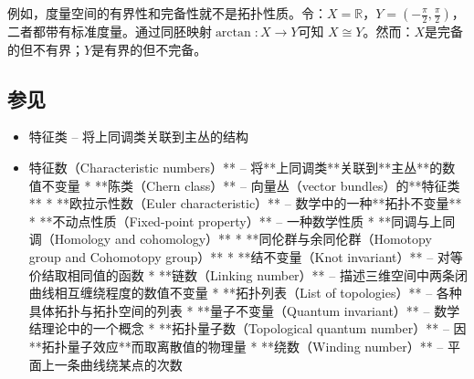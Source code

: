 例如，度量空间的有界性和完备性就不是拓扑性质。令：$X = \mathbb{R}$，$Y = \left(-\tfrac{\pi}{2}, \tfrac{\pi}{2}\right)$，二者都带有标准度量。通过同胚映射$
\arctan: X \to Y$可知 $X \cong Y$。然而：$X$是完备的但不有界；$Y$是有界的但不完备。
\subsection{参见}
\begin{itemize}
\item 特征类 – 将上同调类关联到主丛的结构
\item 特征数（Characteristic numbers）** – 将**上同调类**关联到**主丛**的数值不变量
* **陈类（Chern class）** – 向量丛（vector bundles）的**特征类**
* **欧拉示性数（Euler characteristic）** – 数学中的一种**拓扑不变量**
* **不动点性质（Fixed-point property）** – 一种数学性质
* **同调与上同调（Homology and cohomology）**
* **同伦群与余同伦群（Homotopy group and Cohomotopy group）**
* **结不变量（Knot invariant）** – 对等价结取相同值的函数
* **链数（Linking number）** – 描述三维空间中两条闭曲线相互缠绕程度的数值不变量
* **拓扑列表（List of topologies）** – 各种具体拓扑与拓扑空间的列表
* **量子不变量（Quantum invariant）** – 数学结理论中的一个概念
* **拓扑量子数（Topological quantum number）** – 因**拓扑量子效应**而取离散值的物理量
* **绕数（Winding number）** – 平面上一条曲线绕某点的次数
\end{itemize}
